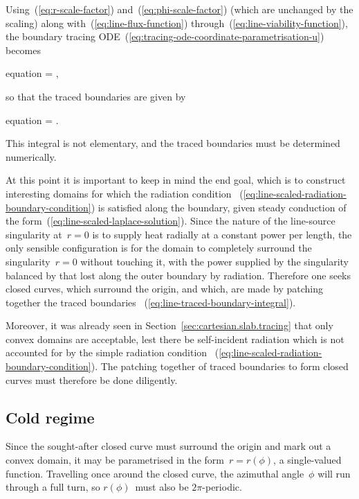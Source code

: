 Using~(\ref{eq:r-scale-factor}) and~(\ref{eq:phi-scale-factor})
(which are unchanged by the scaling)
along with~(\ref{eq:line-flux-function})
through~(\ref{eq:line-viability-function}),
the boundary tracing ODE~(\ref{eq:tracing-ode-coordinate-parametrisation-u})
becomes
\begin{important}{equation}
   = \mp {},
  \label{eq:line-tracing-ode-coordinate-parametrisation-r}
\end{important}
so that the traced boundaries are given by
\begin{important}{equation}
  \phi = \mp \int {}.
  \label{eq:line-traced-boundary-integral}
\end{important}
This integral is not elementary,
and the traced boundaries must be determined numerically.

At this point it is important to keep in mind the end goal,
which is to construct interesting domains
for which the radiation condition~%
  (\ref{eq:line-scaled-radiation-boundary-condition})
is satisfied along the boundary,
given steady conduction of the form~(\ref{eq:line-scaled-laplace-solution}).
Since the nature of the line-source singularity at~$r = 0$
is to supply heat radially at a constant power per length,
the only sensible configuration is for the domain to
completely surround the singularity~$r = 0$ without touching it,
with the power supplied by the singularity balanced
by that lost along the outer boundary by radiation.
Therefore one seeks closed curves,
which surround the origin,
and which, are made by patching together the traced boundaries~%
  (\ref{eq:line-traced-boundary-integral}).

Moreover, it was already seen in Section~\ref{sec:cartesian.slab.tracing}
that only convex domains are acceptable,
lest there be self-incident radiation which is not accounted for
by the simple radiation condition~%
  (\ref{eq:line-scaled-radiation-boundary-condition}).
The patching together of traced boundaries to form closed curves
must therefore be done diligently.

\subsection{Cold regime}
\label{sec:polar.tracing.cold}

Since the sought-after closed curve must surround the origin
and mark out a convex domain,
it may be parametrised in the form~$r = r (\phi)$,
a single-valued function.
Travelling once around the closed curve,
the azimuthal angle~$\phi$ will run through a full turn,
so $r (\phi)$~must also be $2 \pi$-periodic.

